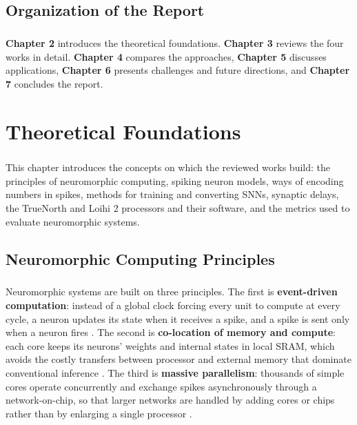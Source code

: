 \documentclass[12pt,a4paper,final]{extreport}
\begin{document}
\section{Organization of the Report}

\paragraph{} \textbf{Chapter 2} introduces the theoretical foundations. \textbf{Chapter 3} reviews the four works in detail. \textbf{Chapter 4} compares the approaches, \textbf{Chapter 5} discusses applications, \textbf{Chapter 6} presents challenges and future directions, and \textbf{Chapter 7} concludes the report.

\chapter{Theoretical Foundations}

\paragraph{} This chapter introduces the concepts on which the reviewed works build: the principles of neuromorphic computing, spiking neuron models, ways of encoding numbers in spikes, methods for training and converting SNNs, synaptic delays, the TrueNorth and Loihi 2 processors and their software, and the metrics used to evaluate neuromorphic systems.

\section{Neuromorphic Computing Principles}

\paragraph{} Neuromorphic systems are built on three principles. The first is \textbf{event-driven computation}: instead of a global clock forcing every unit to compute at every cycle, a neuron updates its state when it receives a spike, and a spike is sent only when a neuron fires \cite{p3}. The second is \textbf{co-location of memory and compute}: each core keeps its neurons' weights and internal states in local SRAM, which avoids the costly transfers between processor and external memory that dominate conventional inference \cite{p4}. The third is \textbf{massive parallelism}: thousands of simple cores operate concurrently and exchange spikes asynchronously through a network-on-chip, so that larger networks are handled by adding cores or chips rather than by enlarging a single processor \cite{p2}.
\end{document}
